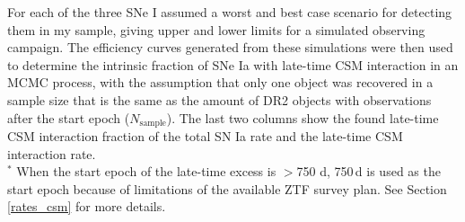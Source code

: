 \documentclass[a4paper,oneside,12pt, class=Latex/Classes/PhDthesisPSnPDF, crop=false]{standalone}
\begin{document}
\begin{table}
 \centering
 \caption{Parameters used for rate estimation simulations for each object.}
\begin{flushleft}
For each of the three SNe I assumed a worst and best case scenario for detecting them in my sample, giving upper and lower limits for a simulated observing campaign. The efficiency curves generated from these simulations were then used to determine the intrinsic fraction of SNe Ia with late-time CSM interaction in an MCMC process, with the assumption that only one object was recovered in a sample size that is the same as the amount of DR2 objects with observations after the start epoch ($N_\text{sample}$). The last two columns show the found late-time CSM interaction fraction of the total SN Ia rate and the late-time CSM interaction rate.\\
$^{*}$ When the start epoch of the late-time excess is $>$750 d, 750\,d is used as the start epoch because of limitations of the available ZTF survey plan. See Section \ref{rates_csm} for more details.\\
\end{flushleft} 
 \label{rate_sims}
\end{table}
\end{document}
